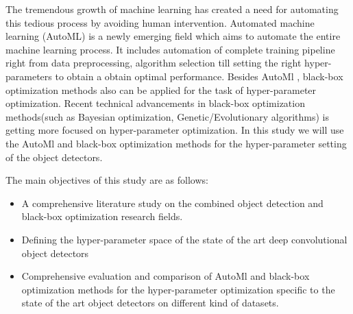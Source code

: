 \documentclass[thesis]{mas_proposal}
\begin{document}
The tremendous growth of machine learning has created a need for automating this tedious process by avoiding human intervention. Automated machine learning (AutoML) is a newly emerging field which aims to automate the entire machine learning process. It includes automation of complete training pipeline right from data preprocessing, algorithm selection till setting the right hyper-parameters to obtain a obtain optimal performance. Besides AutoMl , black-box optimization methods also can be applied for the task of hyper-parameter optimization. Recent technical advancements in black-box optimization methods(such as Bayesian optimization, Genetic/Evolutionary algorithms) is getting more focused on hyper-parameter optimization. In this study we will use the AutoMl and black-box optimization methods for the hyper-parameter setting of the  object detectors.

The main objectives of this study are as follows: 
\begin{itemize}
    \item A comprehensive literature study on the combined object detection and black-box optimization research fields.
    \item Defining the hyper-parameter space of the state of the art deep convolutional object detectors 
    \item Comprehensive evaluation and comparison of  AutoMl and black-box optimization methods for the hyper-parameter optimization specific to the state of the art object detectors on different kind of datasets.
\end{itemize}
    
    
\end{document}
